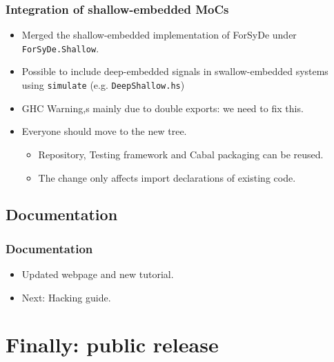 \documentclass{beamer}
\begin{document}
\begin{frame}
  \frametitle{Integration of shallow-embedded MoCs}
  \begin{itemize}
  \item Merged the shallow-embedded implementation of ForSyDe under
    \texttt{ForSyDe.Shallow}.
  \item Possible to include deep-embedded signals in swallow-embedded
    systems using \texttt{simulate} (e.g. \texttt{DeepShallow.hs})
  \item GHC Warning,s mainly due to double exports: we need to fix this.
  \item Everyone should move to the new tree.
    \begin{itemize}
    \item Repository, Testing framework and Cabal packaging can be
      reused.
    \item The change only affects import declarations of existing code.
    \end{itemize}
  \end{itemize}
  
\end{frame}

\subsection{Documentation}

\begin{frame}
  \frametitle{Documentation}
  \begin{itemize}
  \item Updated webpage and new tutorial.
  \item Next: Hacking guide.
  \end{itemize}
  
\end{frame}

\section{Finally: public release}
\end{document}
